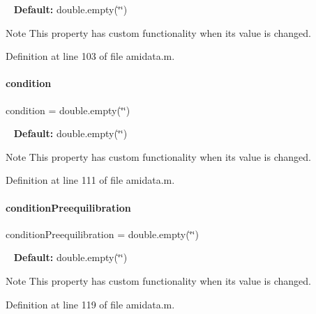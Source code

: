 ~\newline
{\bfseries Default\+:} double.\+empty(\char`\"{}\char`\"{})

\begin{DoxyNote}{Note}
This property has custom functionality when its value is changed. 
\end{DoxyNote}


Definition at line 103 of file amidata.\+m.

\mbox{\label{classamidata_a4824b91cc0e6b5f112bdd8049af4d7d6}} 
\paragraph{\texorpdfstring{condition}{condition}}
{\footnotesize\ttfamily condition = double.\+empty(\char`\"{}\char`\"{})}

~\newline
{\bfseries Default\+:} double.\+empty(\char`\"{}\char`\"{})

\begin{DoxyNote}{Note}
This property has custom functionality when its value is changed. 
\end{DoxyNote}


Definition at line 111 of file amidata.\+m.

\mbox{\label{classamidata_af7a0dbd9e6e3f3cb15ae008beeaf841a}} 
\paragraph{\texorpdfstring{condition\+Preequilibration}{conditionPreequilibration}}
{\footnotesize\ttfamily condition\+Preequilibration = double.\+empty(\char`\"{}\char`\"{})}

~\newline
{\bfseries Default\+:} double.\+empty(\char`\"{}\char`\"{})

\begin{DoxyNote}{Note}
This property has custom functionality when its value is changed. 
\end{DoxyNote}


Definition at line 119 of file amidata.\+m.

